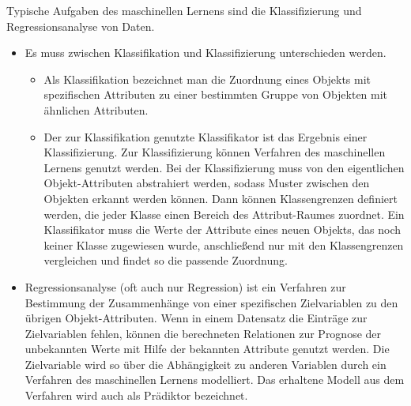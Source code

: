 \documentclass[
	12pt,
	a4paper,
	BCOR10mm,
	DIV14,
	listof=totoc,
	bibliography=totoc,
	headsepline
]{scrreprt}
\begin{document}
Typische Aufgaben des maschinellen Lernens sind die Klassifizierung und Regressionsanalyse von Daten.
\begin{itemize}
\item Es muss zwischen Klassifikation und Klassifizierung unterschieden werden.
\begin{itemize}
\item Als Klassifikation bezeichnet man die Zuordnung eines Objekts mit spezifischen Attributen zu einer bestimmten Gruppe von Objekten mit ähnlichen Attributen.
\item Der zur Klassifikation genutzte Klassifikator ist das Ergebnis einer Klassifizierung.
Zur Klassifizierung können Verfahren des maschinellen Lernens genutzt werden. Bei der Klassifizierung muss von den eigentlichen Objekt-Attributen abstrahiert werden, sodass Muster zwischen den Objekten erkannt werden können. Dann können Klassengrenzen definiert werden, die jeder Klasse einen Bereich des Attribut-Raumes zuordnet. Ein Klassifikator muss die Werte der Attribute eines neuen Objekts, das noch keiner Klasse zugewiesen wurde, anschließend nur mit den Klassengrenzen vergleichen und findet so die passende Zuordnung.
\end{itemize}
\item Regressionsanalyse (oft auch nur Regression) ist ein Verfahren zur Bestimmung der Zusammenhänge von einer spezifischen Zielvariablen zu den übrigen Objekt-Attributen. Wenn in einem Datensatz die Einträge zur Zielvariablen fehlen, können die berechneten Relationen zur Prognose der unbekannten Werte mit Hilfe der bekannten Attribute genutzt werden. Die Zielvariable wird so über die Abhängigkeit zu anderen Variablen durch ein Verfahren des maschinellen Lernens modelliert. Das erhaltene Modell aus dem Verfahren wird auch als Prädiktor bezeichnet. 	
\end{itemize}
\end{document}
